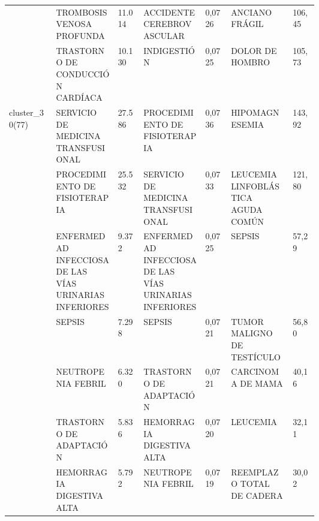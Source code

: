 \begin{landscape}
\begin{longtable}[c]{@{}lp{0.2\linewidth}lp{0.2\linewidth}lp{0.2\linewidth}l@{}}
                                  & TROMBOSIS VENOSA PROFUNDA                                     & 11.014 & ACCIDENTE CEREBROVASCULAR                              & 0,0726 & ANCIANO FRÁGIL                                                & 106,45   \\
                                  & TRASTORNO DE CONDUCCIÓN CARDÍACA                              & 10.130 & INDIGESTIÓN                                            & 0,0725 & DOLOR DE HOMBRO                                               & 105,73   \\
\multirow{10}{*}{cluster\_30(77)} & SERVICIO DE MEDICINA TRANSFUSIONAL                            & 27.586 & PROCEDIMIENTO DE FISIOTERAPIA                          & 0,0736 & HIPOMAGNESEMIA                                                & 143,92   \\
                                  & PROCEDIMIENTO DE FISIOTERAPIA                                 & 25.532 & SERVICIO DE MEDICINA TRANSFUSIONAL                     & 0,0733 & LEUCEMIA LINFOBLÁSTICA AGUDA COMÚN                            & 121,80   \\
                                  & ENFERMEDAD INFECCIOSA DE LAS VÍAS URINARIAS INFERIORES        & 9.372  & ENFERMEDAD INFECCIOSA DE LAS VÍAS URINARIAS INFERIORES & 0,0725 & SEPSIS                                                        & 57,29    \\
                                  & SEPSIS                                                        & 7.298  & SEPSIS                                                 & 0,0721 & TUMOR MALIGNO DE TESTÍCULO                                    & 56,80    \\
                                  & NEUTROPENIA FEBRIL                                            & 6.320  & TRASTORNO DE ADAPTACIÓN                                & 0,0721 & CARCINOMA DE MAMA                                             & 40,16    \\
                                  & TRASTORNO DE ADAPTACIÓN                                       & 5.836  & HEMORRAGIA DIGESTIVA ALTA                              & 0,0720 & LEUCEMIA                                                      & 32,11    \\
                                  & HEMORRAGIA DIGESTIVA ALTA                                     & 5.792  & NEUTROPENIA FEBRIL                                     & 0,0719 & REEMPLAZO TOTAL DE CADERA                                     & 30,02    \\

\end{longtable}
\end{landscape}
